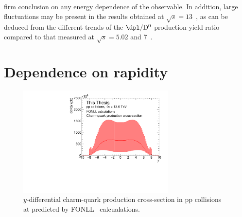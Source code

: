 firm conclusion on any energy dependence of the observable. In addition, large fluctuations may be present in the results obtained at $\sqrt{s} = 13$~\tev, as can be deduced from the different trends of the $\dpl/\mathrm{D^0}$ production-yield ratio compared to that measured at $\sqrt{s} = 5.02$ and 7~\tev.

\section{Dependence on rapidity}
\begin{figure} 
    \centering
    \includegraphics[width=0.7\textwidth]{Figures/Chapter 7/FONLLVsY.pdf}
    \caption{$y$-differential charm-quark production cross-section in  pp collisions at \thirteen predicted by FONLL~\cite{Cacciari:1998it} calcualations.}
    \label{fig:FONLLVsY}
\end{figure}
